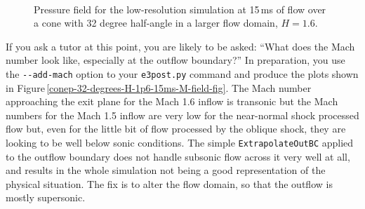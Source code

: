 \begin{figure}[htbp]
\begin{center}
\\
\end{center}
\caption{Pressure field for the low-resolution simulation at 15\,ms
         of flow over a cone with 32 degree half-angle
         in a larger flow domain, $H=1.6$.}
\label{conep-32-degrees-H-1p6-15ms-fig}
\end{figure}

\medskip
If you ask a tutor at this point, you are likely to be asked: 
``What does the Mach number look like, especially at the outflow boundary?''
In preparation, you use the \verb!--add-mach! option to your \verb!e3post.py! command
and produce the plots shown in Figure\,\ref{conep-32-degrees-H-1p6-15ms-M-field-fig}.
The Mach number approaching the exit plane for the Mach 1.6 inflow is transonic but
the Mach numbers for the Mach 1.5 inflow are very low for the near-normal shock processed flow
but, even for the little bit of flow processed by the oblique shock, they are looking to be
well below sonic conditions.
The simple \verb!ExtrapolateOutBC! applied to the outflow boundary 
does not handle subsonic flow across it very well at all,
and results in the whole simulation not being a good representation of the physical situation.
The fix is to alter the flow domain, so that the outflow is mostly supersonic.

